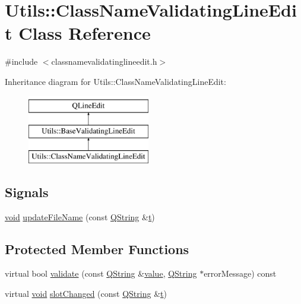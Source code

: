 \hypertarget{class_utils_1_1_class_name_validating_line_edit}{\section{Utils\-:\-:Class\-Name\-Validating\-Line\-Edit Class Reference}
\label{class_utils_1_1_class_name_validating_line_edit}
}


{\ttfamily \#include $<$classnamevalidatinglineedit.\-h$>$}

Inheritance diagram for Utils\-:\-:Class\-Name\-Validating\-Line\-Edit\-:\begin{figure}[H]
\begin{center}
\leavevmode
\includegraphics[height=3.000000cm]{class_utils_1_1_class_name_validating_line_edit}
\end{center}
\end{figure}
\subsection*{Signals}
\begin{DoxyCompactItemize}
\item 
\hyperlink{group___u_a_v_objects_plugin_ga444cf2ff3f0ecbe028adce838d373f5c}{void} \hyperlink{class_utils_1_1_class_name_validating_line_edit_a61f9408be184ce1f403c4b75b7d36c06}{update\-File\-Name} (const \hyperlink{group___u_a_v_objects_plugin_gab9d252f49c333c94a72f97ce3105a32d}{Q\-String} \&\hyperlink{glext_8h_a00140d6f5c548b26daf170bf16e86a6d}{t})
\end{DoxyCompactItemize}
\subsection*{Protected Member Functions}
\begin{DoxyCompactItemize}
\item 
virtual bool \hyperlink{class_utils_1_1_class_name_validating_line_edit_ac58e9df4310d647fb83e92d82ffa53a1}{validate} (const \hyperlink{group___u_a_v_objects_plugin_gab9d252f49c333c94a72f97ce3105a32d}{Q\-String} \&\hyperlink{glext_8h_aa0e2e9cea7f208d28acda0480144beb0}{value}, \hyperlink{group___u_a_v_objects_plugin_gab9d252f49c333c94a72f97ce3105a32d}{Q\-String} $\ast$error\-Message) const 
\item 
virtual \hyperlink{group___u_a_v_objects_plugin_ga444cf2ff3f0ecbe028adce838d373f5c}{void} \hyperlink{class_utils_1_1_class_name_validating_line_edit_ae688632f3e52f39969a7cdae84ee288b}{slot\-Changed} (const \hyperlink{group___u_a_v_objects_plugin_gab9d252f49c333c94a72f97ce3105a32d}{Q\-String} \&\hyperlink{glext_8h_a00140d6f5c548b26daf170bf16e86a6d}{t})
\end{DoxyCompactItemize}
